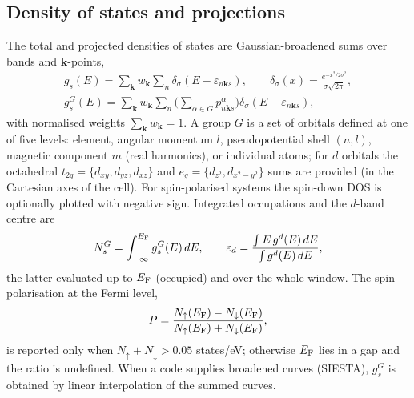 \subsection{Density of states and projections}
The total and projected densities of states are Gaussian-broadened sums over bands and $\bm{k}$-points,
\begin{gather}
g_s(E)=\sum_{\bm{k}}w_{\bm{k}}\sum_n\delta_\sigma(E-\varepsilon_{n\bm{k} s}),\qquad
\delta_\sigma(x)=\frac{e^{-x^2/2\sigma^2}}{\sigma\sqrt{2\pi}},\\
g^{G}_s(E)=\sum_{\bm{k}}w_{\bm{k}}\sum_n\Big(\sum_{\alpha\in G}p^{\alpha}_{n\bm{k} s}\Big)\delta_\sigma(E-\varepsilon_{n\bm{k} s}),
\end{gather}
with normalised weights $\sum_{\bm{k}}w_{\bm{k}}=1$. A group $G$ is a set of orbitals defined at one of five levels: element, angular momentum $l$, pseudopotential shell $(n,l)$, magnetic component $m$ (real harmonics), or individual atoms; for $d$ orbitals the octahedral $t_{2g}=\{d_{xy},d_{yz},d_{xz}\}$ and $e_g=\{d_{z^2},d_{x^2-y^2}\}$ sums are provided (in the Cartesian axes of the cell). For spin-polarised systems the spin-down DOS is optionally plotted with negative sign. Integrated occupations and the $d$-band centre \cite{hammer1995} are
\begin{equation}
N^{G}_s=\int_{-\infty}^{E_\mathrm{F}}g^{G}_s(E)\,dE,\qquad \varepsilon_d=\frac{\int E\,g^{d}(E)\,dE}{\int g^{d}(E)\,dE},
\end{equation}
the latter evaluated up to $E_\mathrm{F}$ (occupied) and over the whole window. The spin polarisation at the Fermi level,
\begin{equation}
P=\frac{N_\uparrow(E_\mathrm{F})-N_\downarrow(E_\mathrm{F})}{N_\uparrow(E_\mathrm{F})+N_\downarrow(E_\mathrm{F})},
\end{equation}
is reported only when $N_\uparrow+N_\downarrow>0.05$ states/eV; otherwise $E_\mathrm{F}$ lies in a gap and the ratio is undefined. When a code supplies broadened curves (SIESTA), $g^{G}_s$ is obtained by linear interpolation of the summed curves.

